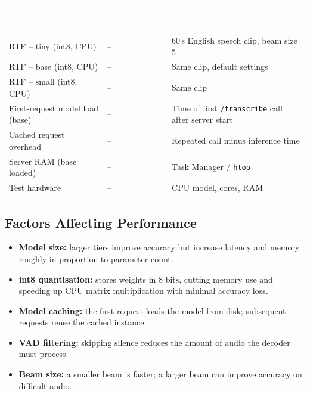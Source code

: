 \documentclass[11pt,a4paper]{article}
\newcommand{\thc}[1]{\textcolor{white}{\bfseries #1}}
\newcommand{\headrow}{\rowcolor{headblue}}
\begin{document}
\begin{tabularx}{\textwidth}{|L{4.0cm}|L{3.0cm}|Y|}
\hline
\headrow \thc{Metric Dimension} & \thc{Observed Value} & \thc{How It Was Measured} \\ \hline
RTF -- tiny (int8, CPU) & -- & 60\,s English speech clip, beam size 5 \\ \hline
RTF -- base (int8, CPU) & -- & Same clip, default settings \\ \hline
RTF -- small (int8, CPU) & -- & Same clip \\ \hline
First-request model load (base) & -- & Time of first \texttt{/transcribe} call after server start \\ \hline
Cached request overhead & -- & Repeated call minus inference time \\ \hline
Server RAM (base loaded) & -- & Task Manager / \texttt{htop} \\ \hline
Test hardware & -- & CPU model, cores, RAM \\ \hline
\end{tabularx}

\subsection{Factors Affecting Performance}
\begin{itemize}[leftmargin=1.2em,itemsep=1pt]
  \item \textbf{Model size:} larger tiers improve accuracy but increase latency and memory roughly in proportion to parameter count.
  \item \textbf{int8 quantisation:} stores weights in 8 bits, cutting memory use and speeding up CPU matrix multiplication with minimal accuracy loss.
  \item \textbf{Model caching:} the first request loads the model from disk; subsequent requests reuse the cached instance.
  \item \textbf{VAD filtering:} skipping silence reduces the amount of audio the decoder must process.
  \item \textbf{Beam size:} a smaller beam is faster; a larger beam can improve accuracy on difficult audio.
\end{itemize}
\end{document}
